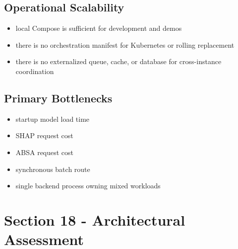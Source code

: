 \subsection{Operational Scalability}
\begin{itemize}[leftmargin=1.2em]
  \item local Compose is sufficient for development and demos
  \item there is no orchestration manifest for Kubernetes or rolling replacement
  \item there is no externalized queue, cache, or database for cross-instance coordination
\end{itemize}

\subsection{Primary Bottlenecks}
\begin{itemize}[leftmargin=1.2em]
  \item startup model load time
  \item SHAP request cost
  \item ABSA request cost
  \item synchronous batch route
  \item single backend process owning mixed workloads
\end{itemize}

\section{Section 18 - Architectural Assessment}
